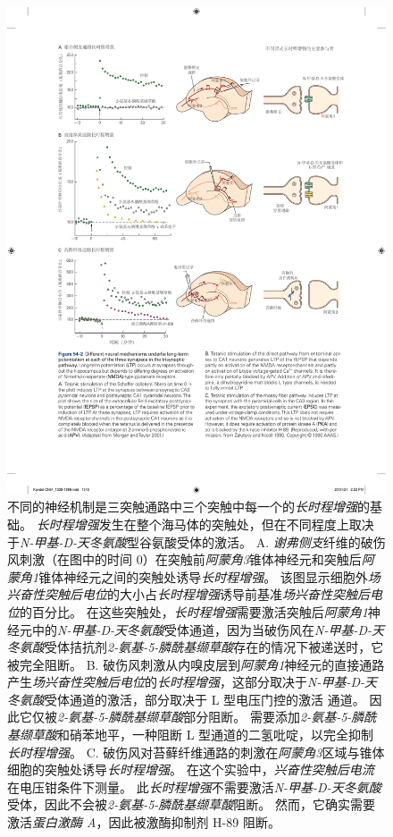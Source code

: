 \begin{figure}[htbp]
	\centering
	\includegraphics[width=1.0\linewidth]{chap54/fig_54_2}
	\caption{不同的神经机制是三突触通路中三个突触中每一个的\textit{长时程增强}的基础。
		\textit{长时程增强}发生在整个海马体的突触处，但在不同程度上取决于\textit{N-甲基-D-天冬氨酸}型谷氨酸受体的激活。
		A. \textit{谢弗侧支}纤维的破伤风刺激（在图中的时间 0）在突触前\textit{阿蒙角3}锥体神经元和突触后\textit{阿蒙角1}锥体神经元之间的突触处诱导\textit{长时程增强}。
		该图显示细胞外\textit{场兴奋性突触后电位}的大小占\textit{长时程增强}诱导前基准\textit{场兴奋性突触后电位}的百分比。
		在这些突触处，\textit{长时程增强}需要激活突触后\textit{阿蒙角1}神经元中的\textit{N-甲基-D-天冬氨酸}受体通道，因为当破伤风在\textit{N-甲基-D-天冬氨酸}受体拮抗剂\textit{2-氨基-5-膦酰基缬草酸}存在的情况下被递送时，它被完全阻断\cite{morgan2001electrical}。
		B. 破伤风刺激从内嗅皮层到\textit{阿蒙角1}神经元的直接通路产生\textit{场兴奋性突触后电位}的\textit{长时程增强}，这部分取决于\textit{N-甲基-D-天冬氨酸}受体通道的激活，部分取决于 L 型电压门控的激活  通道。
		因此它仅被\textit{2-氨基-5-膦酰基缬草酸}部分阻断。
		需要添加\textit{2-氨基-5-膦酰基缬草酸}和硝苯地平，一种阻断 L 型通道的二氢吡啶，以完全抑制\textit{长时程增强}。
		C. 破伤风对苔藓纤维通路的刺激在\textit{阿蒙角3}区域与锥体细胞的突触处诱导\textit{长时程增强}。
		在这个实验中，\textit{兴奋性突触后电流}在电压钳条件下测量。
		此\textit{长时程增强}不需要激活\textit{N-甲基-D-天冬氨酸}受体，因此不会被\textit{2-氨基-5-膦酰基缬草酸}阻断。
		然而，它确实需要激活\textit{蛋白激酶 A}，因此被激酶抑制剂 H-89 阻断\cite{zalutsky1990comparison}。}
	\label{fig:54_2}
\end{figure}


